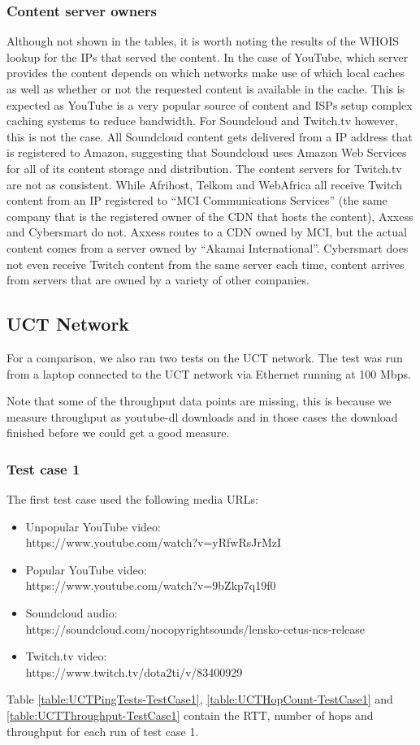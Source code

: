 \documentclass{sig-alternate-05-2015}
\begin{document}
\subsubsection{Content server owners}
Although not shown in the tables, it is worth noting the results of the WHOIS lookup for the IPs that served the content. In the case of YouTube, which server provides the content depends on which networks make use of which local caches as well as whether or not the requested content is available in the cache. This is expected as YouTube is a very popular source of content and ISPs setup complex caching systems to reduce bandwidth. For Soundcloud and Twitch.tv however, this is not the case. All Soundcloud content gets delivered from a IP address that is registered to Amazon, suggesting that Soundcloud uses Amazon Web Services for all of its content storage and distribution. The content servers for Twitch.tv are not as consistent. While Afrihost, Telkom and WebAfrica all receive Twitch content from an IP registered to ``MCI Communications Services'' (the same company that is the registered owner of the CDN that hosts the content), Axxess and Cybersmart do not. Axxess routes to a CDN owned by MCI, but the actual content comes from a server owned by ``Akamai International''. Cybersmart does not even receive Twitch content from the same server each time, content arrives from servers that are owned by a variety of other companies.

\subsection{UCT Network}
For a comparison, we also ran two tests on the UCT network. The test was run from a laptop connected to the UCT network via Ethernet running at 100 Mbps.

Note that some of the throughput data points are missing, this is because we measure throughput as youtube-dl downloads and in those cases the download finished before we could get a good measure.
\subsubsection{Test case 1}
The first test case used the following media URLs:
\begin{itemize}
	\item Unpopular YouTube video: \\ 
	https://www.youtube.com/watch?v=yRfwRsJrMzI
	\item Popular YouTube video: \\
	https://www.youtube.com/watch?v=9bZkp7q19f0
	\item Soundcloud audio: \\ https://soundcloud.com/nocopyrightsounds/lensko-cetus-ncs-release
	\item Twitch.tv video: \\ https://www.twitch.tv/dota2ti/v/83400929
\end{itemize}
Table \ref{table:UCTPingTests-TestCase1}, \ref{table:UCTHopCount-TestCase1} and \ref{table:UCTThroughput-TestCase1} contain the RTT, number of hops and throughput for each run of test case 1.
\end{document}
